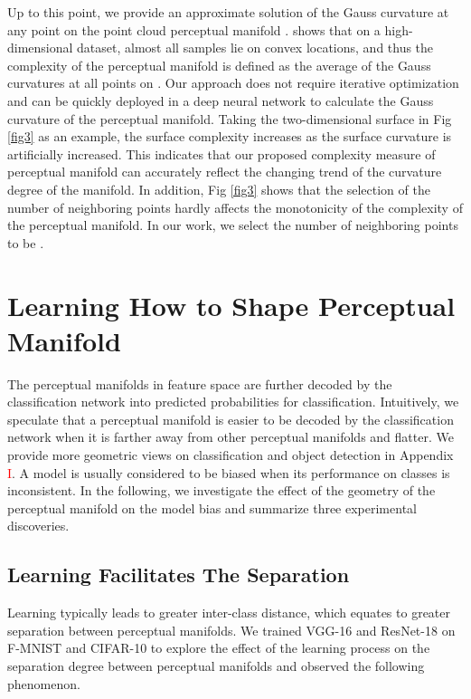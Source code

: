 \documentclass[10pt,twocolumn,letterpaper]{article}
\begin{document}
Up to this point, we provide an approximate solution of the Gauss curvature at any point on the point cloud perceptual manifold . \cite{paper56} shows that on a high-dimensional dataset, almost all samples lie on convex locations, and thus the complexity of the perceptual manifold is defined as the average  of the Gauss curvatures at all points on . Our approach does not require iterative optimization and can be quickly deployed in a deep neural network to calculate the Gauss curvature of the perceptual manifold. Taking the two-dimensional surface in Fig \ref{fig3} as an example, the surface complexity increases as the surface curvature is artificially increased. This indicates that our proposed complexity measure of perceptual manifold can accurately reflect the changing trend of the curvature degree of the manifold. In addition, Fig \ref{fig3} shows that the selection of the number of neighboring points hardly affects the monotonicity of the complexity of the perceptual manifold. In our work, we select the number of neighboring points to be .

\section{Learning How to Shape Perceptual Manifold}
\label{sec4}

The perceptual manifolds in feature space are further decoded by the classification network into predicted probabilities for classification. Intuitively, we speculate that a perceptual manifold is easier to be decoded by the classification network when it is farther away from other perceptual manifolds and flatter. We provide more geometric views on classification and object detection in Appendix \textcolor{red}{I}. A model is usually considered to be biased when its performance on classes is inconsistent. In the following, we investigate the effect of the geometry of the perceptual manifold on the model bias and summarize three experimental discoveries.

\subsection{Learning Facilitates The Separation}
\label{sec4.1}

Learning typically leads to greater inter-class distance, which equates to greater separation between perceptual manifolds. We trained VGG-16 \cite{paper16} and ResNet-18 \cite{paper21} on F-MNIST \cite{paper55} and CIFAR-10 \cite{paper25} to explore the effect of the learning process on the separation degree between perceptual manifolds and observed the following phenomenon.
\end{document}
